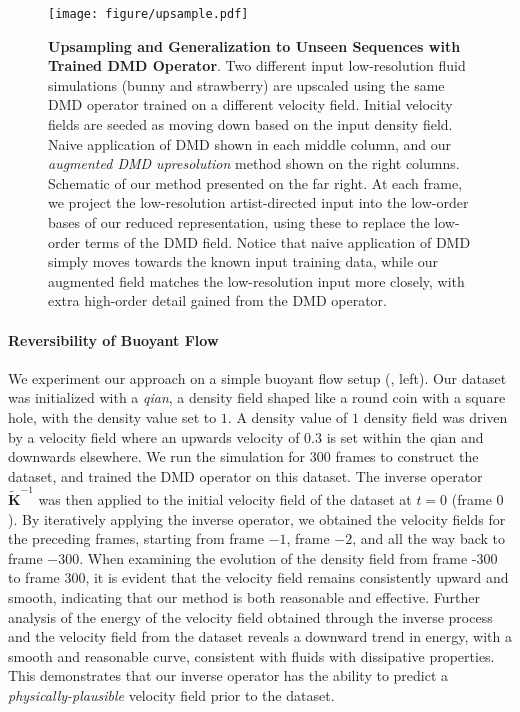\begin{figure*}[!ht]
    \centering
    \texttt{[image: figure/upsample.pdf]}
    \caption{\textbf{Upsampling and Generalization to Unseen Sequences with Trained DMD Operator}. Two different input low-resolution fluid simulations (bunny and strawberry) are upscaled using the same DMD operator trained on a different velocity field. Initial velocity fields are seeded as moving down based on the input density field.    
    Naive application of DMD shown in each middle column, and our \emph{augmented DMD upresolution} method shown on the right columns. 
    Schematic of our method presented on the far right. At each frame, we project the low-resolution artist-directed input into the low-order bases of our reduced representation, using these to replace the low-order terms of the DMD field. Notice that naive application of DMD simply moves towards the known input training data, while our augmented field matches the low-resolution input more closely, with extra high-order detail gained from the DMD operator.}
    \label{fig:upsample}
    \Description{}
\end{figure*}


\paragraph{Reversibility of Buoyant Flow}
We experiment our approach on a simple buoyant flow setup (, left). Our dataset was initialized with a \textit{qian}, a density field shaped like a round coin with a square hole, with the density value set to $1$. A density value of $1$ density field was driven by a velocity field where an upwards velocity of $0.3$ is set within the qian and downwards elsewhere. We run the simulation for $300$ frames to construct the dataset, and trained the DMD operator on this dataset. The inverse operator $\bm{\tilde{K}}^{-1}$ was then applied to the initial velocity field of the dataset at $t=0$ (frame $0$). By iteratively applying the inverse operator, we obtained the velocity fields for the preceding frames, starting from frame $-1$, frame $-2$, and all the way back to frame $-300$.
When examining the evolution of the density field from frame -300 to frame 300, it is evident that the velocity field remains consistently upward and smooth, indicating that our method is both reasonable and effective.
Further analysis of the energy of the velocity field obtained through the inverse process and the velocity field from the dataset reveals a downward trend in energy, with a smooth and reasonable curve, consistent with fluids with dissipative properties. This demonstrates that our inverse operator has the ability to predict a \emph{physically-plausible} velocity field prior to the dataset.

